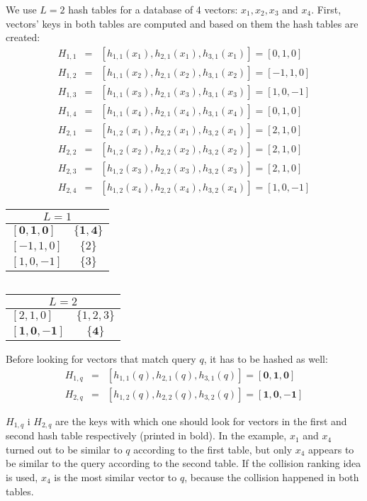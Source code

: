 We use $L = 2$ hash tables for a database of 4 vectors:
$x_1, x_2, x_3$ and $x_4$. 
First, vectors' keys in both tables are computed and based on them the hash tables are created:
\begin{eqnarray*}
H_{1,1} & = & [h_{1,1}(x_1), h_{2,1}(x_1), h_{3,1}(x_1)] = [0, 1, 0]\\
H_{1,2} & = &  [h_{1,1}(x_2), h_{2,1}(x_2), h_{3,1}(x_2)] = [-1, 1, 0]\\
H_{1,3} & = &  [h_{1,1}(x_3), h_{2,1}(x_3), h_{3,1}(x_3)] = [1, 0, -1]\\
H_{1,4} & = &  [h_{1,1}(x_4), h_{2,1}(x_4), h_{3,1}(x_4)] = [0, 1, 0]\\
H_{2,1} & = &  [h_{1,2}(x_1), h_{2,2}(x_1), h_{3,2}(x_1)] = [2, 1, 0]\\
H_{2,2} & = &  [h_{1,2}(x_2), h_{2,2}(x_2), h_{3,2}(x_2)] = [2, 1, 0]\\
H_{2,3} & = &  [h_{1,2}(x_3), h_{2,2}(x_3), h_{3,2}(x_3)] = [2, 1, 0]\\
H_{2,4} & = &  [h_{1,2}(x_4), h_{2,2}(x_4), h_{3,2}(x_4)] = [1, 0, -1]
\end{eqnarray*}
\renewcommand{\arraystretch}{1.2}
\begin{center}
\begin{tabular}{|l|c|}
\hline
\multicolumn{2}{|c|}{$L = 1$} \\
\hline
$\bm{[0, 1, 0]}$ & $\bm{\{1, 4\}}$ \\
\hline
$[-1, 1, 0]$ & $\{2\}$ \\
\hline
$[1, 0, -1]$ & $\{3\}$ \\
\hline
\end{tabular}
$\ \ \ \ $
\begin{tabular}{|l|c|}
\hline
\multicolumn{2}{|c|}{$L = 2$} \\
\hline
$[2, 1, 0]$ & $\{1, 2, 3\}$ \\
\hline
$\bm{[1, 0, -1]}$ & $\bm{\{4\}}$ \\
\hline
\end{tabular}
\end{center}

Before looking for vectors that match query $q$, it has to be hashed as well:
\begin{eqnarray*}
H_{1,q} & = & [h_{1,1}(q), h_{2,1}(q), h_{3,1}(q)] = \bm{[0, 1, 0]} \\
H_{2,q} & = & [h_{1,2}(q), h_{2,2}(q), h_{3,2}(q)] = \bm{[1, 0, -1]} 
\end{eqnarray*}

$H_{1,q}$ i $H_{2,q}$ are the keys with which one should look for vectors in the first and second hash table respectively (printed in bold).
In the example, $x_1$ and $x_4$ turned out to be similar to $q$ according to the first table, but only $x_4$ appears to be similar to the query according to the second table.
If the collision ranking idea is used, $x_4$ is the most similar vector to $q$, because the collision happened in both tables.
